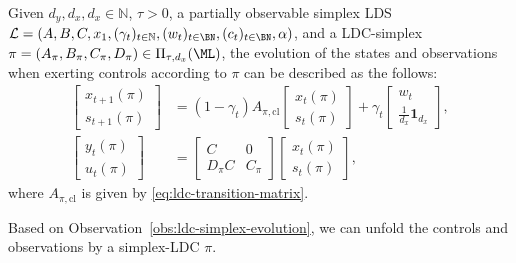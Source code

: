 \begin{observation}
\label{obs:ldc-simplex-evolution}
Given $d_y,d_x,d_x\in\mathbb{N}$, $\tau>0$, a partially observable simplex LDS $\mathcal{L}=(A, B, C, x_1, (\gamma_t)_{t\in\mathbb{N}}, (w_t)_{t\in\BN},(c_t)_{t\in\BN}, \alpha)$, and a LDC-simplex $\pi=(A_{\pi}, B_{\pi}, C_{\pi}, D_{\pi})\in\Pi_{\tau, d_x}(\ML)$, the evolution of the states and observations when exerting controls according to $\pi$ can be described as the follows: 
\begin{align*}
\begin{bmatrix}
x_{t+1}(\pi) \\
s_{t+1}(\pi)
\end{bmatrix}
&=(1-\gamma_t)A_{\pi,\mathrm{cl}}\begin{bmatrix}
x_t(\pi)\\
s_t(\pi)
\end{bmatrix}+\gamma_t \begin{bmatrix}
w_t\\
\frac{1}{d_x}\mathbf{1}_{d_x}
\end{bmatrix}, \\
\begin{bmatrix}
y_{t}(\pi) \\
u_{t}(\pi)
\end{bmatrix}
&=\begin{bmatrix}
C & 0\\
D_{\pi}C & C_{\pi}
\end{bmatrix}\begin{bmatrix}
x_t(\pi)\\
s_t(\pi)
\end{bmatrix},
\end{align*}
where $A_{\pi,\mathrm{cl}}$ is given by \cref{eq:ldc-transition-matrix}.
\end{observation} 

Based on Observation~\ref{obs:ldc-simplex-evolution}, we can unfold the controls and observations by a simplex-LDC $\pi$.

